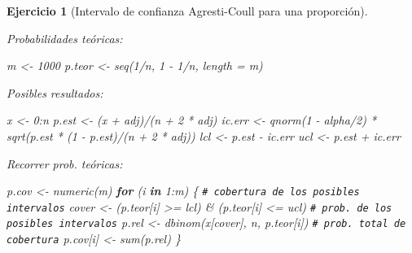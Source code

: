 \documentclass[
  10pt,
]{book}
\newenvironment{Shaded}{\begin{snugshade}}{\end{snugshade}}
\newcommand{\AttributeTok}[1]{\textcolor[rgb]{0.77,0.63,0.00}{#1}}
\newcommand{\CommentTok}[1]{\textcolor[rgb]{0.56,0.35,0.01}{\textit{#1}}}
\newcommand{\ControlFlowTok}[1]{\textcolor[rgb]{0.13,0.29,0.53}{\textbf{#1}}}
\newcommand{\DecValTok}[1]{\textcolor[rgb]{0.00,0.00,0.81}{#1}}
\newcommand{\FunctionTok}[1]{\textcolor[rgb]{0.00,0.00,0.00}{#1}}
\newcommand{\NormalTok}[1]{#1}
\newcommand{\OtherTok}[1]{\textcolor[rgb]{0.56,0.35,0.01}{#1}}
\newcommand{\SpecialCharTok}[1]{\textcolor[rgb]{0.00,0.00,0.00}{#1}}
\theoremstyle{break}
\newtheorem{exercise}{Ejercicio}[chapter]
\theoremstyle{nonumberplain}
\renewcommand{\CommentTok}[1]{\textcolor[rgb]{0.41,0.41,0.41}{\texttt{#1}}}
\begin{document}
\begin{exercise}[Intervalo de confianza Agresti-Coull para una proporción]
\begin{enumerate}
  Probabilidades teóricas:

\begin{Shaded}
\begin{Highlighting}[]
\NormalTok{m }\OtherTok{\textless{}{-}} \DecValTok{1000}
\NormalTok{p.teor }\OtherTok{\textless{}{-}} \FunctionTok{seq}\NormalTok{(}\DecValTok{1}\SpecialCharTok{/}\NormalTok{n, }\DecValTok{1} \SpecialCharTok{{-}} \DecValTok{1}\SpecialCharTok{/}\NormalTok{n, }\AttributeTok{length =}\NormalTok{ m) }
\end{Highlighting}
\end{Shaded}

  Posibles resultados:

\begin{Shaded}
\begin{Highlighting}[]
\NormalTok{x }\OtherTok{\textless{}{-}} \DecValTok{0}\SpecialCharTok{:}\NormalTok{n}
\NormalTok{p.est }\OtherTok{\textless{}{-}}\NormalTok{ (x }\SpecialCharTok{+}\NormalTok{ adj)}\SpecialCharTok{/}\NormalTok{(n }\SpecialCharTok{+} \DecValTok{2} \SpecialCharTok{*}\NormalTok{ adj) }
\NormalTok{ic.err }\OtherTok{\textless{}{-}} \FunctionTok{qnorm}\NormalTok{(}\DecValTok{1} \SpecialCharTok{{-}}\NormalTok{ alpha}\SpecialCharTok{/}\DecValTok{2}\NormalTok{) }\SpecialCharTok{*} \FunctionTok{sqrt}\NormalTok{(p.est }\SpecialCharTok{*}\NormalTok{ (}\DecValTok{1} \SpecialCharTok{{-}}\NormalTok{ p.est)}\SpecialCharTok{/}\NormalTok{(n }\SpecialCharTok{+} \DecValTok{2} \SpecialCharTok{*}\NormalTok{ adj))  }
\NormalTok{lcl }\OtherTok{\textless{}{-}}\NormalTok{ p.est }\SpecialCharTok{{-}}\NormalTok{ ic.err }
\NormalTok{ucl }\OtherTok{\textless{}{-}}\NormalTok{ p.est }\SpecialCharTok{+}\NormalTok{ ic.err }
\end{Highlighting}
\end{Shaded}

  Recorrer prob. teóricas:

\begin{Shaded}
\begin{Highlighting}[]
\NormalTok{p.cov }\OtherTok{\textless{}{-}} \FunctionTok{numeric}\NormalTok{(m)}
\ControlFlowTok{for}\NormalTok{ (i }\ControlFlowTok{in} \DecValTok{1}\SpecialCharTok{:}\NormalTok{m) \{}
  \CommentTok{\# cobertura de los posibles intervalos}
\NormalTok{  cover }\OtherTok{\textless{}{-}}\NormalTok{ (p.teor[i] }\SpecialCharTok{\textgreater{}=}\NormalTok{ lcl) }\SpecialCharTok{\&}\NormalTok{ (p.teor[i] }\SpecialCharTok{\textless{}=}\NormalTok{ ucl)  }
  \CommentTok{\# prob. de los posibles intervalos}
\NormalTok{  p.rel }\OtherTok{\textless{}{-}} \FunctionTok{dbinom}\NormalTok{(x[cover], n, p.teor[i])           }
  \CommentTok{\# prob. total de cobertura}
\NormalTok{  p.cov[i] }\OtherTok{\textless{}{-}} \FunctionTok{sum}\NormalTok{(p.rel)                            }
\NormalTok{\}}
\end{Highlighting}
\end{Shaded}


\end{enumerate}
\end{exercise}
\end{document}
